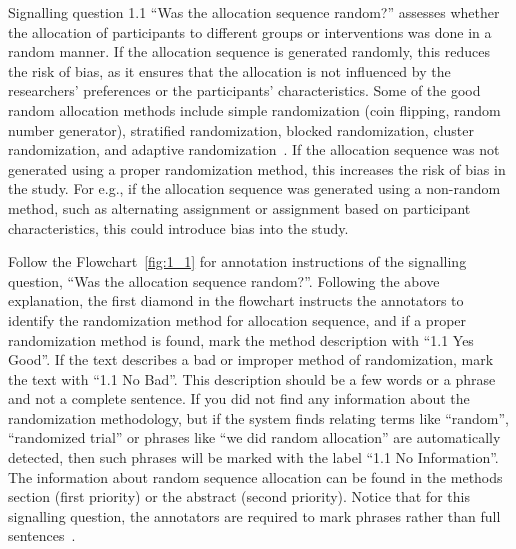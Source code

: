 \documentclass[sn-mathphys,Numbered]{sn-jnl}%
\begin{document}
Signalling question 1.1 ``Was the allocation sequence random?'' assesses whether the allocation of participants to different groups or interventions was done in a random manner.
If the allocation sequence is generated randomly, this reduces the risk of bias, as it ensures that the allocation is not influenced by the researchers' preferences or the participants' characteristics.
Some of the good random allocation methods include simple randomization (coin flipping, random number generator), stratified randomization, blocked randomization, cluster randomization, and adaptive randomization~\cite{sterne2019rob}.
If the allocation sequence was not generated using a proper randomization method, this increases the risk of bias in the study.
For e.g., if the allocation sequence was generated using a non-random method, such as alternating assignment or assignment based on participant characteristics, this could introduce bias into the study.



Follow the Flowchart~\ref{fig:1_1} for annotation instructions of the signalling question, ``Was the allocation sequence random?''.
Following the above explanation, the first diamond in the flowchart instructs the annotators to identify the randomization method for allocation sequence, and if a proper randomization method is found, mark the method description with ``1.1 Yes Good''.
If the text describes a bad or improper method of randomization, mark the text with ``1.1 No Bad''.
This description should be a few words or a phrase and not a complete sentence.
If you did not find any information about the randomization methodology, but if the system finds relating terms like ``random'', ``randomized trial'' or phrases like ``we did random allocation'' are automatically detected, then such phrases will be marked with the label ``1.1 No Information''.
The information about random sequence allocation can be found in the methods section (first priority) or the abstract (second priority).
Notice that for this signalling question, the annotators are required to mark phrases rather than full sentences~\cite{sterne2019rob,saltaji2017randomized}.
%
%
%
\end{document}

